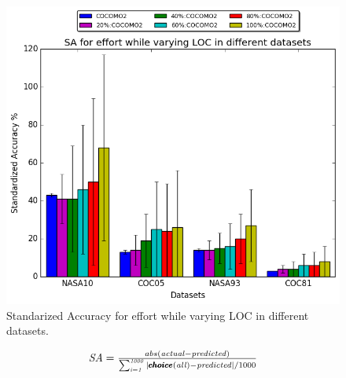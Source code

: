 

\begin{figure}
    \centering
    \includegraphics[scale=0.45]{Figs/sa.png}
    \caption{Standarized Accuracy for effort while varying LOC in different datasets.}
    \label{fig:sa_datasets}
\end{figure}


\begin{equation}\label{eq:sa}
\mbox{$ \mathit{SA}=\frac{abs(\mathit{actual} - \mathit{predicted})}{\mathit{\sum_{i=1}^{1000}|\pmb{choice}(all) - predicted|}/1000}$}
\end{equation}

